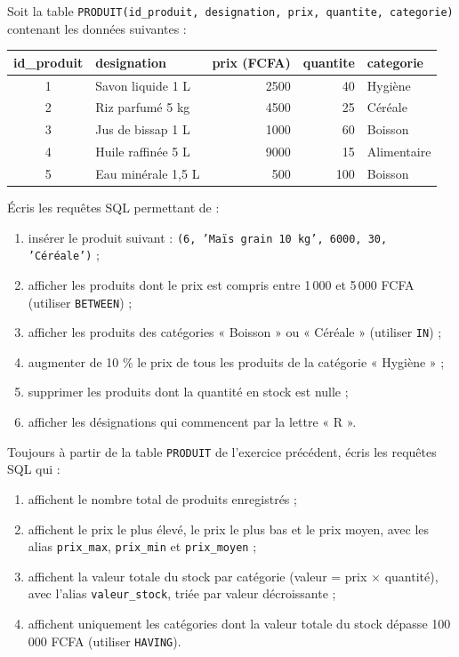 \documentclass[11pt]{article}
\begin{document}
\begin{exercice}
Soit la table \texttt{PRODUIT(id\_produit, designation, prix, quantite, categorie)} contenant les données suivantes :

\begin{center}
\begin{tabularx}{\linewidth}{|c|X|r|r|l|}
\hline
\rowcolor{popblueL}
\textbf{id\_produit} & \textbf{designation} & \textbf{prix (FCFA)} & \textbf{quantite} & \textbf{categorie} \\
\hline
1 & Savon liquide 1 L & 2500 & 40 & Hygiène \\
\hline
2 & Riz parfumé 5 kg & 4500 & 25 & Céréale \\
\hline
3 & Jus de bissap 1 L & 1000 & 60 & Boisson \\
\hline
4 & Huile raffinée 5 L & 9000 & 15 & Alimentaire \\
\hline
5 & Eau minérale 1,5 L & 500 & 100 & Boisson \\
\hline
\end{tabularx}
\end{center}

Écris les requêtes SQL permettant de :
\begin{enumerate}
\item insérer le produit suivant : \texttt{(6, 'Maïs grain 10 kg', 6000, 30, 'Céréale')} ;
\item afficher les produits dont le prix est compris entre 1\,000 et 5\,000 FCFA (utiliser \texttt{BETWEEN}) ;
\item afficher les produits des catégories « Boisson » ou « Céréale » (utiliser \texttt{IN}) ;
\item augmenter de 10 \% le prix de tous les produits de la catégorie « Hygiène » ;
\item supprimer les produits dont la quantité en stock est nulle ;
\item afficher les désignations qui commencent par la lettre « R ».
\end{enumerate}
\end{exercice}

\begin{exercice}
Toujours à partir de la table \texttt{PRODUIT} de l'exercice précédent, écris les requêtes SQL qui :
\begin{enumerate}
\item affichent le nombre total de produits enregistrés ;
\item affichent le prix le plus élevé, le prix le plus bas et le prix moyen, avec les alias \texttt{prix\_max}, \texttt{prix\_min} et \texttt{prix\_moyen} ;
\item affichent la valeur totale du stock par catégorie (valeur = prix $\times$ quantité), avec l'alias \texttt{valeur\_stock}, triée par valeur décroissante ;
\item affichent uniquement les catégories dont la valeur totale du stock dépasse 100\,000 FCFA (utiliser \texttt{HAVING}).
\end{enumerate}
\end{exercice}
\end{document}
